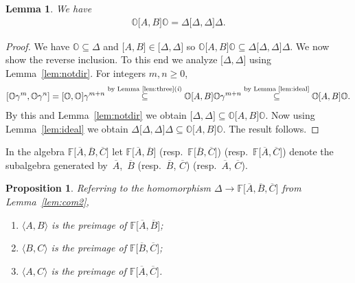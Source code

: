 \documentclass[pdftex]{sigma}
\numberwithin{equation}{section}
\newtheorem{Lemma}[Theorem]{Lemma}
\newtheorem{Proposition}[Theorem]{Proposition}
{\theoremstyle{definition}
\newtheorem{Note}[Theorem]{Note}
\newtheorem{Definition}[Theorem]{Definition}
\newtheorem{Problem}[Theorem]{Problem}
}
\begin{document}
\begin{Lemma}
\label{lem:comu}
We have
\begin{gather*}
\mathbb O \lbrack A,B \rbrack \mathbb O=
\Delta\lbrack  \Delta,\Delta\rbrack \Delta .
\end{gather*}
\end{Lemma}

\begin{proof}
We  have
$\mathbb O \subseteq \Delta $
and
$\lbrack A,B\rbrack \in \lbrack \Delta ,\Delta \rbrack$
so
$\mathbb O \lbrack A,B \rbrack \mathbb  O\subseteq
\Delta\lbrack  \Delta,\Delta\rbrack \Delta $.
We now show the reverse inclusion.
To this end we analyze
$\lbrack \Delta ,\Delta \rbrack$
using
Lemma~\ref{lem:notdir}.
For integers $m,n\geq 0$,
\begin{gather*}
\lbrack \mathbb  O \gamma^m,\mathbb O \gamma^n\rbrack
 =
\lbrack \mathbb  O ,\mathbb  O \rbrack \gamma^{m+n}
\overset{\text{by Lemma \ref{lem:three}({\it i})}}{\subseteq}
\mathbb  O \lbrack A,B\rbrack \mathbb O \gamma^{m+n}
 \overset{\text{by Lemma \ref{lem:ideal}}}{\subseteq}
\mathbb  O \lbrack A,B\rbrack \mathbb O.
\end{gather*}
By
this and Lemma~\ref{lem:notdir} we
obtain
$\lbrack \Delta ,\Delta \rbrack \subseteq
\mathbb  O \lbrack A,B\rbrack \mathbb O$.
Now using
Lemma~\ref{lem:ideal} we obtain
$\Delta \lbrack \Delta ,\Delta \rbrack \Delta  \subseteq
\mathbb  O \lbrack A,B\rbrack \mathbb  O$.
The result follows.
\end{proof}


In the algebra $\mathbb F\lbrack \overline A,\overline B, \overline C\rbrack$
let
$\mathbb F\lbrack \overline A,\overline B\rbrack$
(resp.~$\mathbb F\lbrack \overline B,\overline C\rbrack$)
(resp.~$\mathbb F\lbrack \overline A,\overline C\rbrack$)
denote the subalgebra generated by~$\overline A$,~$\overline B$
(resp.~$\overline B$, $\overline C$)
(resp.~$\overline A$, $\overline C$).

\begin{Proposition}
\label{thm:nice}
Referring to the homomorphism
$\Delta \to
\mathbb F\lbrack \overline A,\overline B, \overline C\rbrack$
from Lemma~{\rm \ref{lem:com2}},
\begin{enumerate}\itemsep=0pt
\item[$(i)$]
$\langle A,B \rangle $ is the preimage of
$\mathbb F\lbrack \overline A,\overline B\rbrack$;
\item[$(ii)$]
$\langle B,C\rangle $ is the  preimage of
$\mathbb F\lbrack \overline B,\overline C\rbrack$;
\item[$(iii)$]
$\langle A,C\rangle $ is the  preimage of
$\mathbb F\lbrack \overline A,\overline C\rbrack$.
\end{enumerate}
\end{Proposition}
\end{document}
